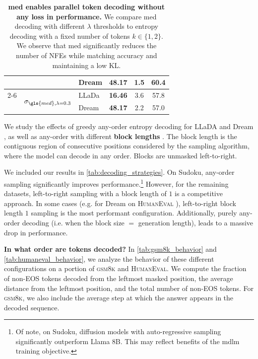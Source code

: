 \begin{table}[h]
\begin{tabular}{lllccc}
         & & Dream & 48.17 & 1.5 & 60.4 \\
       \cmidrule(lr){2-6}
         & \multirow{2}{*}{$\sigma_{\gls{med}, \lambda = 0.3}$}
            & LLaDa & \textbf{16.46} & 3.6 & 57.8 \\
         & & Dream & \textbf{48.17} & 2.2 & 57.0 \\
    \bottomrule        
    \end{tabular}
    \caption{\textbf{\gls{med} enables parallel token decoding without any loss in performance.} We compare \gls{med} decoding with different $\lambda$ thresholds to entropy decoding with a fixed number of tokens $k \in \{1, 2\}$. We observe that \gls{med} significantly reduces the number of NFEs while matching accuracy and maintaining a low KL.}
    \label{tab:multi_token_kl}
\end{table}

We study the effects of greedy any-order entropy decoding \citep{dream2025} for LLaDA \citep{nie2025largelanguagediffusionmodels} and Dream \citep{dream2025}, as well as any-order with different \textbf{block lengths} \citep{sahoo2024simple,arriola2025blockdiffusioninterpolatingautoregressive, nie2025largelanguagediffusionmodels, dream2025}. The block length is the contiguous region of consecutive positions considered by the sampling algorithm, where the model can decode in any order. Blocks are unmasked left-to-right.

We included our results in \cref{tab:decoding_strategies}. On Sudoku, any-order sampling significantly improves performance.\footnote{Of note, on Sudoku, diffusion models with auto-regressive sampling significantly outperform Llama 8B. This may reflect benefits of the \gls{mdlm} training objective.} However, for the remaining datasets, left-to-right sampling with a block length of $1$ is a competitive approach. In some cases (e.g. for Dream on \textsc{HumanEval} \citep{chen2021evaluating}), left-to-right block length $1$ sampling is the most performant configuration. Additionally, purely any-order decoding (i.e. when the block size $=$ generation length), leads to a massive drop in performance. 

\textbf{In what order are tokens decoded?}  In \cref{tab:gsm8k_behavior} and \cref{tab:humaneval_behavior}, we analyze the behavior of these different configurations on a portion of \textsc{gsm8k} and \textsc{HumanEval}. We compute the fraction of non-EOS tokens decoded from the leftmost masked position, the average distance from the leftmost position, and the total number of non-EOS tokens. For \textsc{gsm8k}, we also include the average step at which the answer appears in the decoded sequence.


